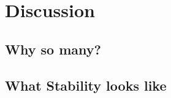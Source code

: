 %
%
%
%
%

\section{Discussion}

\subsection{Why so many?}


\subsection{What Stability looks like}\label{sec:stability}

